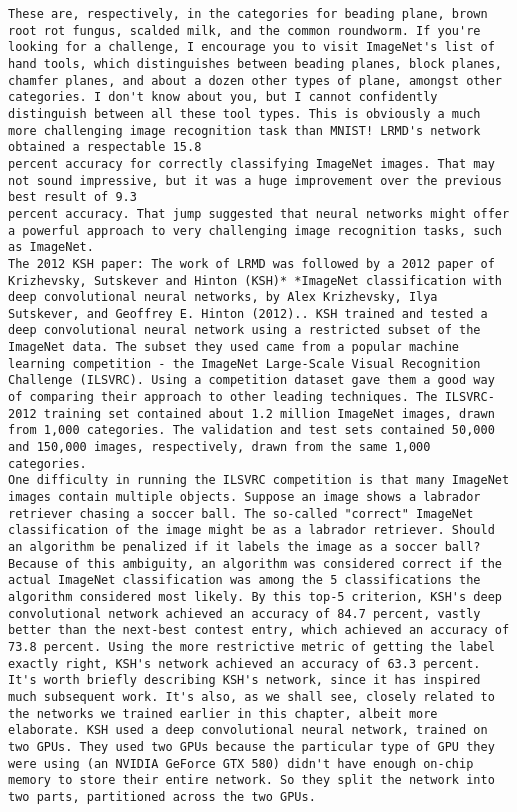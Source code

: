 \begin{lstlisting}
These are, respectively, in the categories for beading plane, brown root rot fungus, scalded milk, and the common roundworm. If you're looking for a challenge, I encourage you to visit ImageNet's list of hand tools, which distinguishes between beading planes, block planes, chamfer planes, and about a dozen other types of plane, amongst other categories. I don't know about you, but I cannot confidently distinguish between all these tool types. This is obviously a much more challenging image recognition task than MNIST! LRMD's network obtained a respectable 15.8
percent accuracy for correctly classifying ImageNet images. That may not sound impressive, but it was a huge improvement over the previous best result of 9.3
percent accuracy. That jump suggested that neural networks might offer a powerful approach to very challenging image recognition tasks, such as ImageNet.
The 2012 KSH paper: The work of LRMD was followed by a 2012 paper of Krizhevsky, Sutskever and Hinton (KSH)* *ImageNet classification with deep convolutional neural networks, by Alex Krizhevsky, Ilya Sutskever, and Geoffrey E. Hinton (2012).. KSH trained and tested a deep convolutional neural network using a restricted subset of the ImageNet data. The subset they used came from a popular machine learning competition - the ImageNet Large-Scale Visual Recognition Challenge (ILSVRC). Using a competition dataset gave them a good way of comparing their approach to other leading techniques. The ILSVRC-2012 training set contained about 1.2 million ImageNet images, drawn from 1,000 categories. The validation and test sets contained 50,000 and 150,000 images, respectively, drawn from the same 1,000 categories.
One difficulty in running the ILSVRC competition is that many ImageNet images contain multiple objects. Suppose an image shows a labrador retriever chasing a soccer ball. The so-called "correct" ImageNet classification of the image might be as a labrador retriever. Should an algorithm be penalized if it labels the image as a soccer ball? Because of this ambiguity, an algorithm was considered correct if the actual ImageNet classification was among the 5 classifications the algorithm considered most likely. By this top-5 criterion, KSH's deep convolutional network achieved an accuracy of 84.7 percent, vastly better than the next-best contest entry, which achieved an accuracy of 73.8 percent. Using the more restrictive metric of getting the label exactly right, KSH's network achieved an accuracy of 63.3 percent.
It's worth briefly describing KSH's network, since it has inspired much subsequent work. It's also, as we shall see, closely related to the networks we trained earlier in this chapter, albeit more elaborate. KSH used a deep convolutional neural network, trained on two GPUs. They used two GPUs because the particular type of GPU they were using (an NVIDIA GeForce GTX 580) didn't have enough on-chip memory to store their entire network. So they split the network into two parts, partitioned across the two GPUs.

\end{lstlisting}
